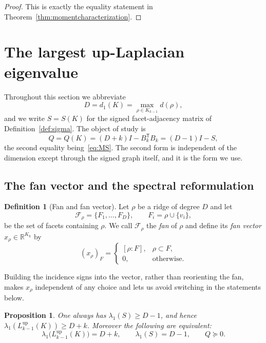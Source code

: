\documentclass[11pt,reqno]{amsart}
\numberwithin{equation}{section}
\theoremstyle{plain}
\newtheorem{proposition}[theorem]{Proposition}
\theoremstyle{definition}
\newtheorem{definition}[theorem]{Definition}
\newcommand{\R}{\mathbb{R}}
\newcommand{\Lup}{L^{\mathrm{up}}}
\newcommand{\T}{\mathsf{T}}
\newcommand{\Fset}{\mathcal F}
\begin{document}
\begin{proof}
This is exactly the equality statement in Theorem~\ref{thm:momentcharacterization}.
\end{proof}




\section{The largest up-Laplacian eigenvalue}\label{sec:largest}

Throughout this section we abbreviate
\[
  D=d_1(K)=\max_{\rho\in K_{k-1}}d(\rho),
\]
and we write $S=S(K)$ for the signed facet-adjacency matrix of Definition~\ref{def:sigma}. The
object of study is
\begin{equation}\label{eq:Qdef}
  Q=Q(K)=(D+k)I-B_k^{\T}B_k=(D-1)I-S ,
\end{equation}
the second equality being~\eqref{eq:MS}. The second form is independent of the dimension except
through the signed graph itself, and it is the form we use.




\subsection{The fan vector and the spectral reformulation}

\begin{definition}[Fan and fan vector]\label{def:fanvector}
Let $\rho$ be a ridge of degree $D$ and let
\[
  \Fset_\rho=\{F_1,\dots,F_D\},\qquad F_i=\rho\cup\{v_i\},
\]
be the set of facets containing $\rho$. We call $\Fset_\rho$ the \emph{fan} of $\rho$ and define
its \emph{fan vector} $x_\rho\in\R^{K_k}$ by
\begin{equation}\label{eq:fanvector}
  {(x_\rho)}_F=\begin{cases}[\rho:F], & \rho\subset F,\\ 0,&\text{otherwise.}\end{cases}
\end{equation}
\end{definition}

Building the incidence signs into the vector, rather than reorienting the fan, makes $x_\rho$
independent of any choice and lets us avoid switching in the statements below.

\begin{proposition}\label{prop:reform}
One always has $\lambda_1(S)\ge D-1$, and hence
$\lambda_1(\Lup_{k-1}(K))\ge D+k$. Moreover the following are equivalent:
\[
  \lambda_1\bigl(\Lup_{k-1}(K)\bigr)=D+k,\qquad
  \lambda_1(S)=D-1,\qquad
  Q\succeq0 .
\]
\end{proposition}
\end{document}
